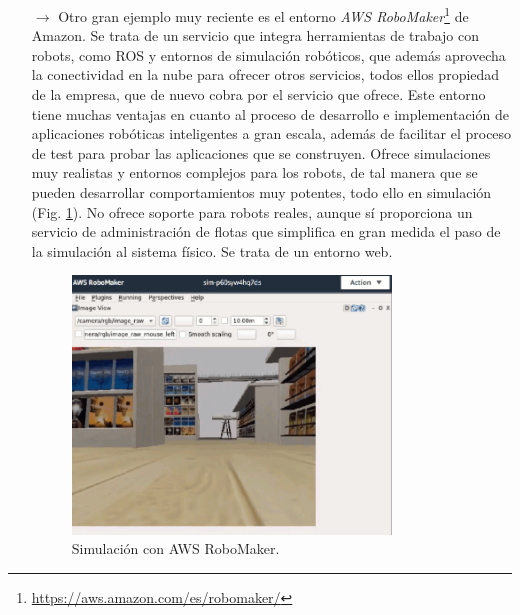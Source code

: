 \begin{itemize}
\item [$\rightarrow$] Otro gran ejemplo muy reciente es el entorno \textit{AWS RoboMaker}\footnote{\url{https://aws.amazon.com/es/robomaker/}} de Amazon. Se trata de un servicio que integra herramientas de trabajo con robots, como ROS y entornos de simulación robóticos, que además aprovecha la conectividad en la nube para ofrecer otros servicios, todos ellos propiedad de la empresa, que de nuevo cobra por el servicio que ofrece. Este entorno tiene muchas ventajas en cuanto al proceso de desarrollo e implementación de aplicaciones robóticas inteligentes a gran escala, además de facilitar el proceso de test para probar las aplicaciones que se construyen. Ofrece simulaciones muy realistas y entornos complejos para los robots, de tal manera que se pueden desarrollar comportamientos muy potentes, todo ello en simulación (Fig. \ref{awsrm}). No ofrece soporte para robots reales, aunque sí proporciona un servicio de administración de flotas que simplifica en gran medida el paso de la simulación al sistema físico. Se trata de un entorno web.

\begin{figure}[!hbtp]  \centering\noindent
    \includegraphics[width=0.8\textwidth]{figures/aws_robomaker.png}
    \caption{Simulación con AWS RoboMaker.}
    \label{awsrm}
\end{figure}


\end{itemize}

